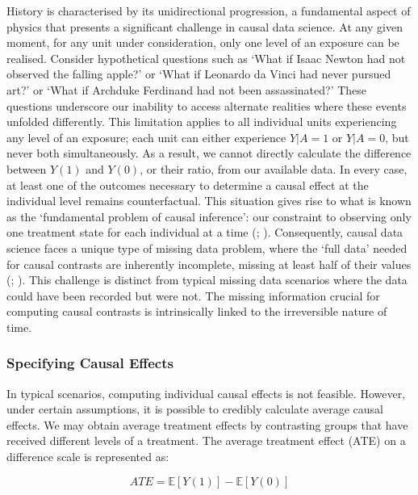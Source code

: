 \documentclass[
  singlecolumn,
  9pt]{article}
\begin{document}
History is characterised by its unidirectional progression, a
fundamental aspect of physics that presents a significant challenge in
causal data science. At any given moment, for any unit under
consideration, only one level of an exposure can be realised. Consider
hypothetical questions such as `What if Isaac Newton had not observed
the falling apple?' or `What if Leonardo da Vinci had never pursued
art?' or `What if Archduke Ferdinand had not been assassinated?' These
questions underscore our inability to access alternate realities where
these events unfolded differently. This limitation applies to all
individual units experiencing any level of an exposure; each unit can
either experience \(Y|A = 1\) or \(Y|A = 0\), but never both
simultaneously. As a result, we cannot directly calculate the difference
between \(Y(1)\) and \(Y(0)\), or their ratio, from our available data.
In every case, at least one of the outcomes necessary to determine a
causal effect at the individual level remains counterfactual. This
situation gives rise to what is known as the `fundamental problem of
causal inference': our constraint to observing only one treatment state
for each individual at a time (;
). Consequently, causal data science
faces a unique type of missing data problem, where the `full data'
needed for causal contrasts are inherently incomplete, missing at least
half of their values (; ). This
challenge is distinct from typical missing data scenarios where the data
could have been recorded but were not. The missing information crucial
for computing causal contrasts is intrinsically linked to the
irreversible nature of time.

\subsubsection{Specifying Causal
Effects}\label{specifying-causal-effects}

In typical scenarios, computing individual causal effects is not
feasible. However, under certain assumptions, it is possible to credibly
calculate average causal effects. We may obtain average treatment
effects by contrasting groups that have received different levels of a
treatment. The average treatment effect (ATE) on a difference scale is
represented as:

\[
ATE  = \mathbb{E}[Y(1)] - \mathbb{E}[Y(0)]
\]
\end{document}
